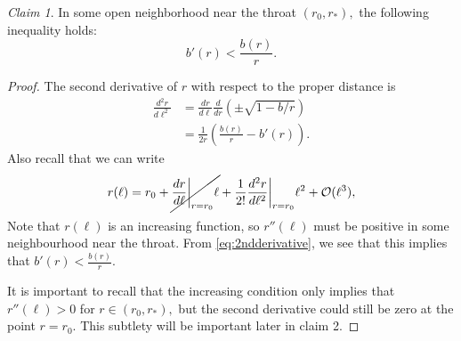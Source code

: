\documentclass[%
 reprint,
 amsmath,amssymb
 aps,
]{revtex4}
\theoremstyle{remark}
\newtheorem{claim}{Claim}
\begin{document}
\begin{claim}
    In some open neighborhood near the throat $(r_0,r_*),$ the following inequality holds:
    \begin{equation}
        b'(r) < \frac{b(r)}{r}.
        \label{eq:claim1}
    \end{equation}
    \begin{proof}
        The second derivative of $r$ with respect to the proper distance is 
        \begin{align}
            \frac{d^2r}{d\ell^2} &= \frac{dr}{d\ell}\frac{d}{dr}\left(\pm \sqrt{1-b/r}\right) \\ 
            &= \frac{1}{2r}\left(\frac{b(r)}{r}-b'(r)\right). \label{eq:2ndderivative}
        \end{align}
        Also recall that we can write 
        \begin{equation}
            r(\ell) = r_0 + \cancel{\frac{dr}{d\ell}\bigg|_{r=r_0}\ell} + \frac{1}{2!}\frac{d^2r}{d\ell^2}\bigg|_{r=r_0}\ell^2 + \mathcal{O}(\ell^3),
        \end{equation}
        Note that $r(\ell)$ is an increasing function, so $r''(\ell)$ must be positive in some neighbourhood near the throat. From \ref{eq:2ndderivative}, we see that this implies that $b'(r) < \frac{b(r)}{r}.$
        \vspace{2mm}
        
        It is important to recall that the increasing condition only implies that $r''(\ell)>0$ for $r\in (r_0,r_*),$ but the second derivative could still be zero at the point $r=r_0.$ This subtlety will be important later in claim 2.
    \end{proof}
\end{claim}
\end{document}
